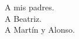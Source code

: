 
\begin{dedication} %

\hfill A mis padres. \\
\hfill A Beatriz. \\
\hfill A Martín y Alonso.

\end{dedication}

